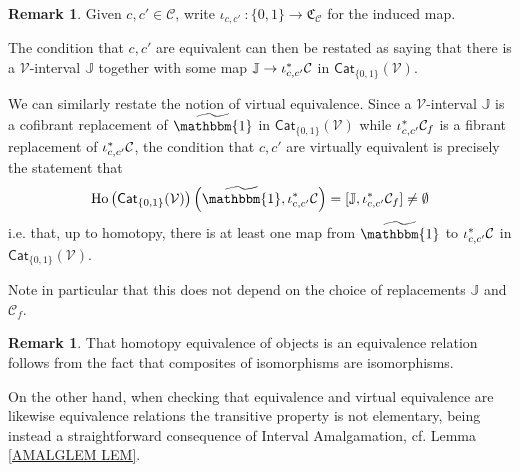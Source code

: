 \documentclass[a4paper,10pt
,draft
]{article}%
\numberwithin{equation}{section}
\numberwithin{figure}{section}
\theoremstyle{definition} %
\newtheorem{remark}[equation]{Remark}%
\DeclareMathOperator{\Ho}{Ho}
\newcommand{\V}{\ensuremath{\mathcal V}}
\newcommand{\1}{\ensuremath{\mathbbm 1}}%
\begin{document}
\begin{remark}\label{VIRTEQRESTA REM}
Given $c,c' \in \mathcal{C}$, write $\iota_{c,c'} \ \colon \{0,1\} \to \mathfrak{C}_{\mathcal{C}}$
for the induced map.

The condition that $c,c'$ are equivalent can then be restated as saying that
there is a $\V$-interval $\mathbb{J}$
together with some map $\mathbb{J} \to \iota^{\**}_{c,c'}\mathcal{C}$ in $\mathsf{Cat}_{\{0,1\}}(\V)$. 

We can similarly restate the notion of virtual equivalence.
Since a $\V$-interval $\mathbb{J}$ is a cofibrant replacement of $\widetilde{\mathbbm{1}}$ in $\mathsf{Cat}_{\{0,1\}}(\V)$
while $\iota^{\**}_{c,c'} \mathcal{C}_f$ is a fibrant replacement of $\iota^{\**}_{c,c'} \mathcal{C}$,
the condition that $c,c'$ are virtually equivalent is precisely the statement that
\[
\Ho \left(\mathsf{Cat}_{\{0,1\}}(\V)\right)\left(\widetilde{\mathbbm{1}},\iota^{\**}_{c,c'} \mathcal{C}\right)
=
[\mathbb{J},\iota^{\**}_{c,c'} \mathcal{C}_f] 
\neq
 \emptyset
\]
i.e. that, up to homotopy, there is at least one map from $\widetilde{\mathbbm{1}}$ to $\iota^{\**}_{c,c'} \mathcal{C}$
in $\mathsf{Cat}_{\{0,1\}}(\V)$.

Note in particular that this does not depend on the choice of %
replacements 
$\mathbb{J}$ and $\mathcal{C}_f$.
\end{remark}


\begin{remark}
That homotopy equivalence of objects is an equivalence relation 
follows from the fact that composites of isomorphisms are isomorphisms.

On the other hand, when checking that equivalence and virtual equivalence are likewise equivalence relations
the transitive property is not elementary, being instead 
a straightforward consequence of Interval Amalgamation, cf. Lemma \ref{AMALGLEM LEM}.
\end{remark}
\end{document}
